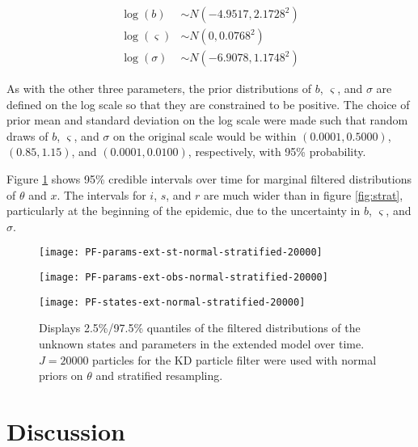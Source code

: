 \documentclass{elsarticle}
\begin{document}
\begin{align*}
\log(b) &\sim  N(-4.9517, 2.1728^2) \\
\log(\varsigma) &\sim N(0, 0.0768^2) \\
\log(\sigma) &\sim N(-6.9078, 1.1748^2)
\end{align*}

As with the other three parameters, the prior distributions of $b$, $\varsigma$, and $\sigma$ are defined on the log scale so that they are constrained to be positive.  The choice of prior mean and standard deviation on the log scale were made such that random draws of $b$, $\varsigma$, and $\sigma$ on the original scale would be within $(0.0001, 0.5000)$, $(0.85, 1.15)$, and $(0.0001, 0.0100)$, respectively, with 95\% probability.

Figure \ref{fig:ext} shows 95\% credible intervals over time for marginal filtered distributions of $\theta$ and $x$.  The intervals for $i$, $s$, and $r$ are much wider than in figure \ref{fig:strat}, particularly at the beginning of the epidemic, due to the uncertainty in $b$, $\varsigma$, and $\sigma$.

\begin{figure}[ht]
\centering
\begin{minipage}{1.0\linewidth}
\texttt{[image: PF-params-ext-st-normal-stratified-20000]}
\end{minipage}
\begin{minipage}{1.0\linewidth}
\texttt{[image: PF-params-ext-obs-normal-stratified-20000]}
\end{minipage}
\begin{minipage}{1.0\linewidth}
\texttt{[image: PF-states-ext-normal-stratified-20000]}
\end{minipage}
\caption{Displays 2.5\%/97.5\% quantiles of the filtered distributions of the unknown states and parameters in the extended model over time.  $J = 20000$ particles for the KD particle filter were used with normal priors on $\theta$ and stratified resampling.} \label{fig:ext}
\end{figure}

\section{Discussion \label{sec:discussion}}



\end{document}
